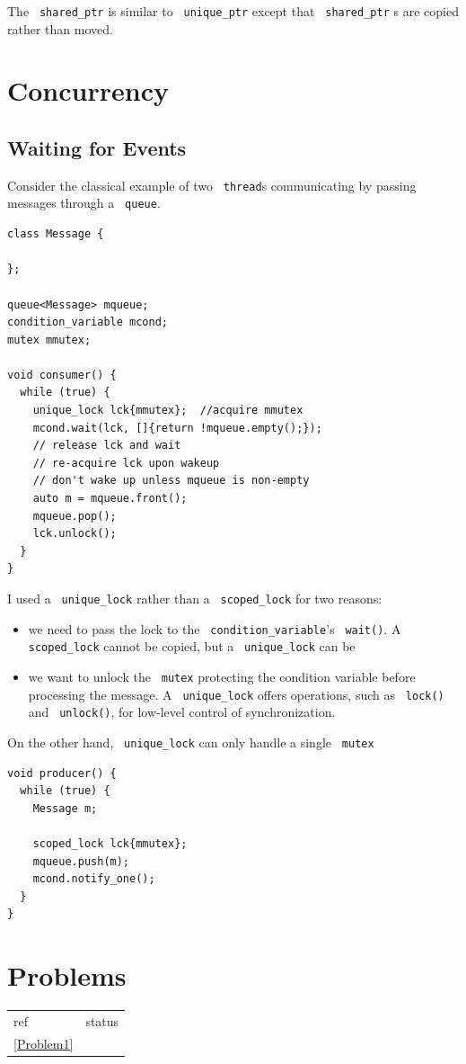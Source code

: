 \documentclass[11pt]{article}
\let\OldTexttt\texttt
\renewcommand{\texttt}[1]{\OldTexttt{\color{MidnightBlue} #1}}
\begin{document}
The \texttt{shared\_ptr} is similar to \texttt{unique\_ptr} except that \texttt{shared\_ptr} s are copied rather than moved.
\section{Concurrency}
\label{sec:orgf05e425}
\subsection{Waiting for Events}
\label{sec:orge8fa676}
Consider the classical example of two \texttt{thread}​s communicating by passing messages through a \texttt{queue}.
\begin{verbatim}
class Message {

};

queue<Message> mqueue;
condition_variable mcond;
mutex mmutex;

void consumer() {
  while (true) {
    unique_lock lck{mmutex};  //acquire mmutex
    mcond.wait(lck, []{return !mqueue.empty();});
    // release lck and wait
    // re-acquire lck upon wakeup
    // don't wake up unless mqueue is non-empty
    auto m = mqueue.front();
    mqueue.pop();
    lck.unlock();
  }
}
\end{verbatim}

I used a \texttt{unique\_lock} rather than a \texttt{scoped\_lock} for two reasons:
\begin{itemize}
\item we need to pass the lock to the \texttt{condition\_variable}'s \texttt{wait()}. A \texttt{scoped\_lock} cannot be copied,
but a \texttt{unique\_lock} can be
\item we want to unlock the \texttt{mutex} protecting the condition variable before processing the message. A
\texttt{unique\_lock} offers operations, such as \texttt{lock()} and \texttt{unlock()}, for low-level control of
synchronization.
\end{itemize}

On the other hand, \texttt{unique\_lock} can only handle a single \texttt{mutex}

\begin{verbatim}
void producer() {
  while (true) {
    Message m;

    scoped_lock lck{mmutex};
    mqueue.push(m);
    mcond.notify_one();
  }
}
\end{verbatim}
\section{Problems}
\label{sec:org5a6570a}
\begin{center}
\begin{tabular}{ll}
ref & status\\
\ref{Problem1} & \\
\end{tabular}
\end{center}
\end{document}
